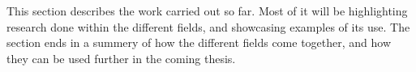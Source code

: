 \label{chap:Work Done}
This section describes the work carried out so far. Most of it will be highlighting research done within the different fields, and showcasing examples of its use. The section ends in a summery of how the different fields come together, and how they can be used further in the coming thesis. 





